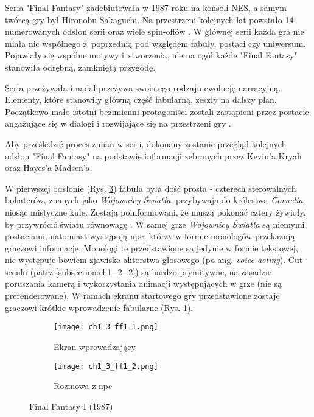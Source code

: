 Seria "Final Fantasy" zadebiutowała w 1987 roku na konsoli NES, a samym twórcą gry był Hironobu
Sakaguchi. Na przestrzeni kolejnych lat powstało 14 numerowanych odsłon serii oraz wiele spin-offów
\cite{the_evolution_of_final_fantasy}. W głównej serii każda gra nie miała nic wspólnego z~poprzednią
pod względem fabuły, postaci czy uniwersum. Pojawiały się wspólne motywy i~stworzenia, ale na ogół
każde "Final Fantasy" stanowiła odrębną, zamkniętą przygodę\cite{the_evolution_of_final_fantasy}.

Seria przeżywała i nadal przeżywa swoistego rodzaju ewolucję narracyjną. Elementy, które stanowiły
główną część fabularną, zeszły na dalszy plan. Początkowo mało istotni bezimienni protagoniści zostali
zastąpieni przez postacie angażujące się w dialogi i rozwijające się na przestrzeni gry
\cite{the_evolution_of_final_fantasy}.

Aby prześledzić proces zmian w serii, dokonany zostanie przegląd kolejnych odsłon "Final Fantasy" na
podstawie informacji zebranych przez Kevin'a Kryah\cite{the_evolution_of_final_fantasy} oraz
Hayes'a Madsen'a\cite{25_years_later}.

W pierwszej odsłonie (Rys. \ref{fig:ch1_3_ff1}) fabuła była dość prosta - czterech sterowalnych
bohaterów, znanych jako \textit{Wojownicy Światła}, przybywają do królestwa \textit{Cornelia}, niosąc
mistyczne kule. Zostają poinformowani, że muszą pokonać cztery żywioły, by przywrócić światu równowagę
\cite{the_evolution_of_final_fantasy}. W samej grze \textit{Wojownicy Światła} są niemymi postaciami,
natomiast występują \gls{npc}, którzy w formie monologów przekazują
graczowi informacje. Monologi te przedstawione są jedynie w formie tekstowej, nie występuje bowiem
zjawisko aktorstwa głosowego (po ang. \textit{voice acting}). Cut-scenki (patrz \ref{subsection:ch1_2_2})
są bardzo prymitywne, na zasadzie poruszania kamerą i wykorzystania animacji występujących w grze
(nie są prerenderowane). W ramach ekranu startowego gry przedstawione zostaje graczowi krótkie
wprowadzenie fabularne (Rys. \ref{subfig:ch_1_3_ff1}).

\begin{figure}[h]
    \begin{subfigure}{0.49\textwidth}
        \caption{Ekran wprowadzający}
        \texttt{[image: ch1\_3\_ff1\_1.png]}
        \label{subfig:ch_1_3_ff1}
    \end{subfigure}
    \begin{subfigure}{0.49\textwidth}
        \caption{Rozmowa z \gls{npc}}
        \texttt{[image: ch1\_3\_ff1\_2.png]}
        \label{subfig:ch_1_3_ff1_2}
    \end{subfigure}
    \caption{Final Fantasy I (1987)}
    \label{fig:ch1_3_ff1}
\end{figure}

